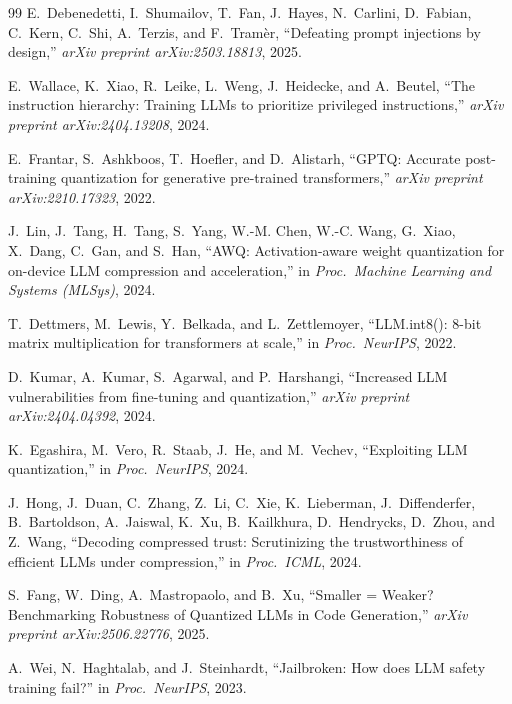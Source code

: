 \documentclass[11pt]{article}
\begin{document}
\begin{thebibliography}{99}
E.~Debenedetti, I.~Shumailov, T.~Fan, J.~Hayes, N.~Carlini, D.~Fabian,
C.~Kern, C.~Shi, A.~Terzis, and F.~Tram\`er,
``Defeating prompt injections by design,''
\emph{arXiv preprint arXiv:2503.18813}, 2025.

E.~Wallace, K.~Xiao, R.~Leike, L.~Weng, J.~Heidecke, and A.~Beutel,
``The instruction hierarchy: Training LLMs to prioritize privileged
instructions,'' \emph{arXiv preprint arXiv:2404.13208}, 2024.

E.~Frantar, S.~Ashkboos, T.~Hoefler, and D.~Alistarh,
``GPTQ: Accurate post-training quantization for generative pre-trained
transformers,'' \emph{arXiv preprint arXiv:2210.17323}, 2022.

J.~Lin, J.~Tang, H.~Tang, S.~Yang, W.-M. Chen, W.-C. Wang, G.~Xiao,
X.~Dang, C.~Gan, and S.~Han,
``AWQ: Activation-aware weight quantization for on-device LLM compression
and acceleration,'' in \emph{Proc.\ Machine Learning and Systems (MLSys)},
2024.

T.~Dettmers, M.~Lewis, Y.~Belkada, and L.~Zettlemoyer,
``LLM.int8(): 8-bit matrix multiplication for transformers at scale,'' in
\emph{Proc.\ NeurIPS}, 2022.

D.~Kumar, A.~Kumar, S.~Agarwal, and P.~Harshangi,
``Increased LLM vulnerabilities from fine-tuning and quantization,''
\emph{arXiv preprint arXiv:2404.04392}, 2024.

K.~Egashira, M.~Vero, R.~Staab, J.~He, and M.~Vechev,
``Exploiting LLM quantization,'' in \emph{Proc.\ NeurIPS}, 2024.

J.~Hong, J.~Duan, C.~Zhang, Z.~Li, C.~Xie, K.~Lieberman, J.~Diffenderfer,
B.~Bartoldson, A.~Jaiswal, K.~Xu, B.~Kailkhura, D.~Hendrycks, D.~Zhou,
and Z.~Wang,
``Decoding compressed trust: Scrutinizing the trustworthiness of efficient
LLMs under compression,'' in \emph{Proc.\ ICML}, 2024.

S.~Fang, W.~Ding, A.~Mastropaolo, and B.~Xu,
``Smaller = Weaker? Benchmarking Robustness of Quantized LLMs in Code
Generation,'' \emph{arXiv preprint arXiv:2506.22776}, 2025.

A.~Wei, N.~Haghtalab, and J.~Steinhardt,
``Jailbroken: How does LLM safety training fail?'' in \emph{Proc.\ NeurIPS},
2023.


\end{thebibliography}
\end{document}
